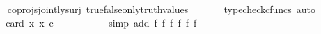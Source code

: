 \begin{isabellebody}
\ \ \ \ \isamarkupfalse%
\ coprojs{\isacharunderscore}{\kern0pt}jointly{\isacharunderscore}{\kern0pt}surj\ true{\isacharunderscore}{\kern0pt}false{\isacharunderscore}{\kern0pt}only{\isacharunderscore}{\kern0pt}truth{\isacharunderscore}{\kern0pt}values\ \isanewline
\ \ \ \ \isamarkupfalse%
\ {\isacharparenleft}{\kern0pt}typecheck{\isacharunderscore}{\kern0pt}cfuncs{\isacharcomma}{\kern0pt}\ auto{\isacharparenright}{\kern0pt}\ \isanewline
\ \ \isamarkupfalse%
\ \isamarkupfalse%
\ {\isachardoublequoteopen}card\ {\isacharbraceleft}{\kern0pt}x{\isachardot}{\kern0pt}\ x\ {\isasymin}\isactrlsub c\ {\isasymOmega}\ {\isasymCoprod}\ {\isasymOmega}{\isacharbraceright}{\kern0pt}\ {\isacharequal}{\kern0pt}\ {}{\isachardoublequoteclose}\isanewline
\ \ \ \ \isamarkupfalse%
\ {\isacharparenleft}{\kern0pt}simp\ add{\isacharcolon}{\kern0pt}\ f{}\ f{}\ f{}\ f{}\ f{}\ f{}{\isacharparenright}{\kern0pt}\isanewline
{}\isamarkupfalse%
%
\endisatagproof
{\isafoldproof}%
%
\isadelimproof
\isanewline
%
\endisadelimproof
%
\isadelimtheory
\isanewline
%
\endisadelimtheory
%
\isatagtheory
{}\isamarkupfalse%
%
\endisatagtheory
{\isafoldtheory}%
%
\isadelimtheory
%
\endisadelimtheory
%
\end{isabellebody}%
\endinput
